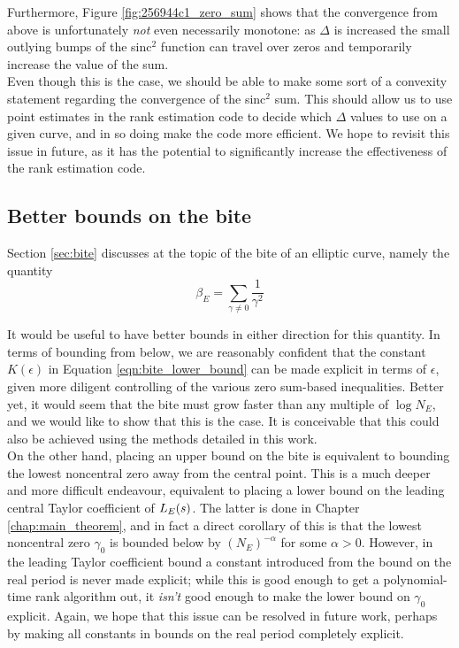 Furthermore, Figure \ref{fig:256944c1_zero_sum} shows that the convergence from above is unfortunately {\it not} even necessarily monotone: as $\Delta$ is increased the small outlying bumps of the sinc$^2$ function can travel over zeros and temporarily increase the value of the sum. \\

Even though this is the case, we should be able to make some sort of a convexity statement regarding the convergence of the sinc$^2$ sum. This should allow us to use point estimates in the rank estimation code to decide which $\Delta$ values to use on a given curve, and in so doing make the code more efficient. We hope to revisit this issue in future, as it has the potential to significantly increase the effectiveness of the rank estimation code.

\subsection{Better bounds on the bite}

Section \ref{sec:bite} discusses at the topic of the bite of an elliptic curve, namely the quantity
\begin{equation}
\beta_E = \sum_{\gamma \ne 0} \frac{1}{\gamma^2}
\end{equation}

It would be useful to have better bounds in either direction for this quantity. In terms of bounding from below, we are reasonably confident that the constant $K(\epsilon)$ in Equation \ref{eqn:bite_lower_bound} can be made explicit in terms of $\epsilon$, given more diligent controlling of the various zero sum-based inequalities. Better yet, it would seem that the bite must grow faster than any multiple of $\log N_E$, and we would like to show that this is the case. It is conceivable that this could also be achieved using the methods detailed in this work. \\

On the other hand, placing an upper bound on the bite is equivalent to bounding the lowest noncentral zero away from the central point. This is a much deeper and more difficult endeavour, equivalent to placing a lower bound on the leading central Taylor coefficient of $L_E(s)$. The latter is done in Chapter \ref{chap:main_theorem}, and in fact a direct corollary of this is that the lowest noncentral zero $\gamma_0$ is bounded below by $(N_E)^{-\alpha}$ for some $\alpha>0$. However, in the leading Taylor coefficient bound a constant introduced from the bound on the real period is never made explicit; while this is good enough to get a polynomial-time rank algorithm out, it {\it isn't} good enough to make the lower bound on $\gamma_0$ explicit. Again, we hope that this issue can be resolved in future work, perhaps by making all constants in bounds on the real period completely explicit.


